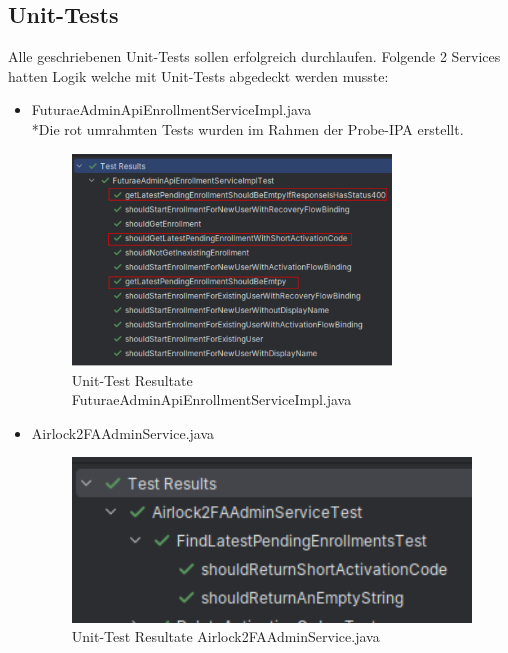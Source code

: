 \subsection{Unit-Tests}
Alle geschriebenen Unit-Tests sollen erfolgreich durchlaufen.
Folgende 2 Services hatten Logik welche mit Unit-Tests abgedeckt werden musste:
\begin{itemize}
	\item FuturaeAdminApiEnrollmentServiceImpl.java\\
	*Die rot umrahmten Tests wurden im Rahmen der Probe-IPA erstellt.
		\begin{figure}[H]
			\begin{center}
				\includegraphics[width=0.8\textwidth]{ressourcen/unittestapi}
				\caption[Unit-Test Resultate FuturaeAdminApiEnrollmentServiceImpl.java]{Unit-Test Resultate FuturaeAdminApiEnrollmentServiceImpl.java}\label{fig:test-admin}
			\end{center}
		\end{figure}
	\item Airlock2FAAdminService.java
		\begin{figure}[H]
			\begin{center}
				\includegraphics[width=1.0\textwidth]{ressourcen/testadmin}
				\caption[Unit-Test Resultate Airlock2FAAdminService.java]{Unit-Test Resultate Airlock2FAAdminService.java}\label{fig:unittest-api}
			\end{center}
		\end{figure}
\end{itemize}	
